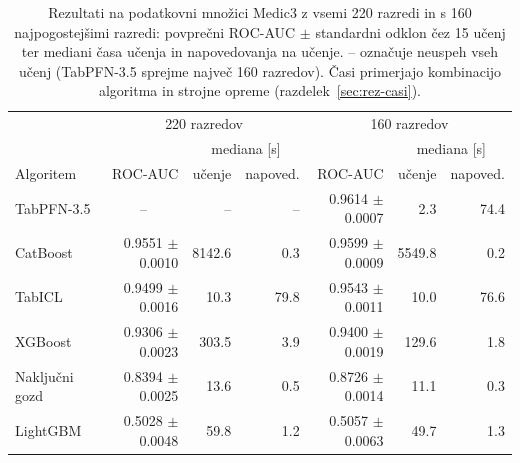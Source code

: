 \begin{table}[H]
\centering
\caption{Rezultati na podatkovni množici Medic3 z vsemi 220 razredi in s 160 najpogostejšimi razredi: povprečni ROC-AUC $\pm$ standardni odklon čez 15 učenj ter mediani časa učenja in napovedovanja na učenje. -- označuje neuspeh vseh učenj (TabPFN-3.5 sprejme največ 160 razredov). Časi primerjajo kombinacijo algoritma in strojne opreme (razdelek~\ref{sec:rez-casi}).}
\label{tab:medic3}
\footnotesize
\setlength{\tabcolsep}{3pt}
\begin{tabular}{lrrrrrr}
\hline
 & \multicolumn{3}{c}{220 razredov} & \multicolumn{3}{c}{160 razredov} \\
 & & \multicolumn{2}{c}{mediana [s]} & & \multicolumn{2}{c}{mediana [s]} \\
Algoritem & ROC-AUC & učenje & napoved. & ROC-AUC & učenje & napoved. \\
\hline
TabPFN-3.5 & \multicolumn{1}{c}{--} & -- & -- & \num{0.9614} $\pm$ \num{0.0007} & \num{2.3} & \num{74.4} \\
CatBoost & \num{0.9551} $\pm$ \num{0.0010} & \num{8142.6} & \num{0.3} & \num{0.9599} $\pm$ \num{0.0009} & \num{5549.8} & \num{0.2} \\
TabICL & \num{0.9499} $\pm$ \num{0.0016} & \num{10.3} & \num{79.8} & \num{0.9543} $\pm$ \num{0.0011} & \num{10.0} & \num{76.6} \\
XGBoost & \num{0.9306} $\pm$ \num{0.0023} & \num{303.5} & \num{3.9} & \num{0.9400} $\pm$ \num{0.0019} & \num{129.6} & \num{1.8} \\
Naključni gozd & \num{0.8394} $\pm$ \num{0.0025} & \num{13.6} & \num{0.5} & \num{0.8726} $\pm$ \num{0.0014} & \num{11.1} & \num{0.3} \\
LightGBM & \num{0.5028} $\pm$ \num{0.0048} & \num{59.8} & \num{1.2} & \num{0.5057} $\pm$ \num{0.0063} & \num{49.7} & \num{1.3} \\
\hline
\end{tabular}
\end{table}

